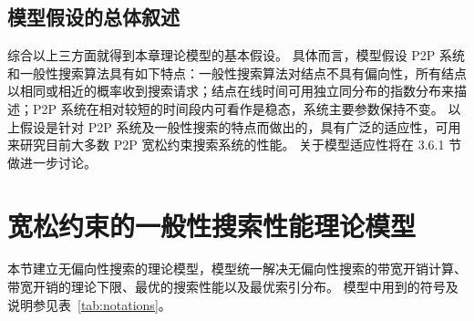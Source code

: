 \documentclass{thuthesis}
\begin{document}
\subsection{模型假设的总体叙述}

综合以上三方面就得到本章理论模型的基本假设。
具体而言，模型假设 P2P 系统和一般性搜索算法具有如下特点：一般性搜索算法对结点不具有偏向性，所有结点以相同或相近的概率收到搜索请求；结点在线时间可用独立同分布的指数分布来描述；P2P 系统在相对较短的时间段内可看作是稳态，系统主要参数保持不变。
以上假设是针对 P2P 系统及一般性搜索的特点而做出的，具有广泛的适应性，可用来研究目前大多数 P2P 宽松约束搜索系统的性能。
关于模型适应性将在 3.6.1 节做进一步讨论。


\section{宽松约束的一般性搜索性能理论模型}

本节建立无偏向性搜索的理论模型，模型统一解决无偏向性搜索的带宽开销计算、带宽开销的理论下限、最优的搜索性能以及最优索引分布。
模型中用到的符号及说明参见表~\ref{tab:notations}。

\newcommand\BWsearch{\mathit{BW}_{\text{search}}}
\newcommand\BWmaintain{\mathit{BW}_{\text{maintain}}}
\newcommand\BWtotal{\mathit{BW}_{\text{total}}}
\newcommand\bwpeer{\mathit{bw}_{\text{peer}}}
\end{document}
